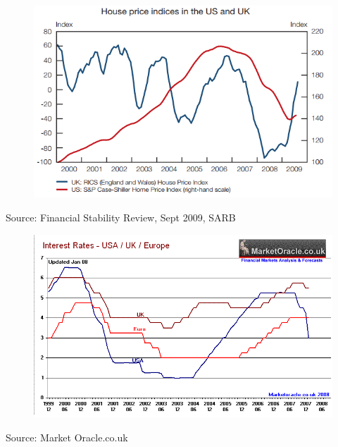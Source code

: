 \documentclass[11pt]{beamer}
\begin{document}
\begin{frame}
\begin{figure}
\includegraphics[width=1\textwidth]{HPUS.png}
\end{figure}
\tiny{Source: Financial Stability Review, Sept 2009, SARB}
\end{frame}


\begin{frame}
\begin{figure}
\includegraphics[width=1\textwidth]{Intrate.png}
\end{figure}
\tiny{Source: Market Oracle.co.uk}
\end{frame}
\end{document}
